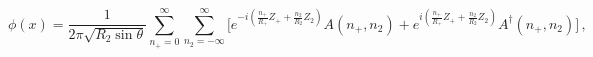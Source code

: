 \begin{equation}
\phi(x) = \frac{1}{2\pi\sqrt{R_2 \sin\theta}}\sum_{n_+=0}^\infty
\sum_{n_2=-\infty}^\infty [e^{-i(\frac{n_+}{R_+}Z_+ +
\frac{n_2}{R_2}Z_2)} A(n_+,n_2)
+ e^{i(\frac{n_+}{R_+}Z_+ + \frac{n_2}{R_2}Z_2)}
A^\dagger(n_+,n_2){]}\,,
\end{equation}

